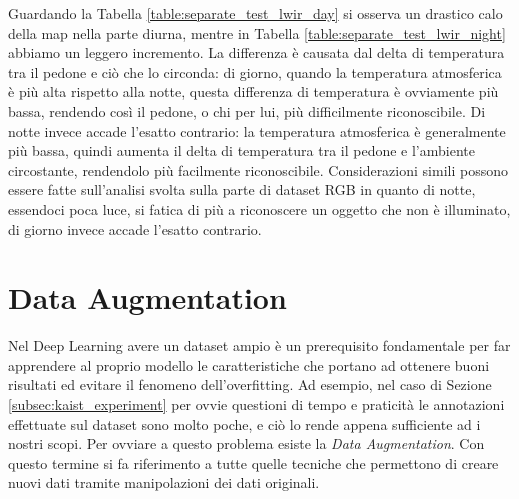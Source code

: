 \begin{table}[]
    \centering
    \caption{Risultati della valutazione separata}
    \label{table:separate_test_lwir_kaist}
\end{table}
Guardando la Tabella \ref{table:separate_test_lwir_day} si osserva un drastico calo della \ac{map} nella parte diurna, mentre in Tabella \ref{table:separate_test_lwir_night} abbiamo un leggero incremento. La differenza è causata dal delta di temperatura tra il pedone e ciò che lo circonda: di giorno, quando la temperatura atmosferica è più alta rispetto alla notte, questa differenza di temperatura è ovviamente più bassa, rendendo così il pedone, o chi per lui, più difficilmente riconoscibile. Di notte invece accade l'esatto contrario: la temperatura atmosferica è generalmente più bassa, quindi aumenta il delta di temperatura tra il pedone e l'ambiente circostante, rendendolo più facilmente riconoscibile. Considerazioni simili possono essere fatte sull'analisi svolta sulla parte di dataset RGB in quanto di notte, essendoci poca luce, si fatica di più a riconoscere un oggetto che non è illuminato, di giorno invece accade l'esatto contrario.



\section{Data Augmentation}
\label{sec:data_augmentation}
Nel Deep Learning avere un dataset ampio è un prerequisito fondamentale per far apprendere al proprio modello le caratteristiche che portano ad ottenere buoni risultati ed evitare il fenomeno dell'overfitting. Ad esempio, nel caso di Sezione \ref{subsec:kaist_experiment} per ovvie questioni di tempo e praticità le annotazioni effettuate sul dataset sono molto poche, e ciò lo rende appena sufficiente ad i nostri scopi. Per ovviare a questo problema esiste la \textit{Data Augmentation}. Con questo termine si fa riferimento a tutte quelle tecniche che permettono di creare nuovi dati tramite manipolazioni dei dati originali. 

